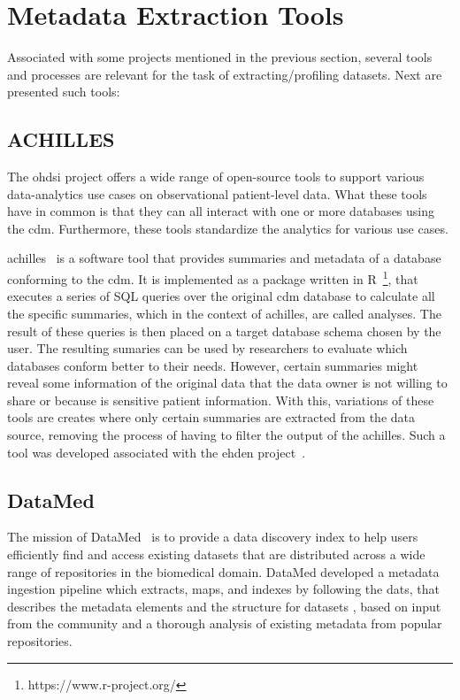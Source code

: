 \section{Metadata Extraction Tools}

Associated with some projects mentioned in the previous section, several tools and
processes are relevant for the task of extracting/profiling datasets.
Next are presented such tools:

\subsection*{ACHILLES}
The \gls{ohdsi} project offers a wide range of open-source tools\cite{ohdsi-tools} to support various data-analytics use cases on observational patient-level data.
What these tools have in common is that they can all interact with one or more databases using the \gls{cdm}.
Furthermore, these tools standardize the analytics for various use cases.

\gls{achilles}~\cite{achilles-github} is a software tool that provides summaries and metadata of a database conforming to the \gls{cdm}.
It is implemented as a package written in R~\footnote{https://www.r-project.org/}, that executes a series of SQL queries over the original \gls{cdm} database to calculate all the specific summaries, which in the context of \gls{achilles}, are called analyses.
The result of these queries is then placed on a target database schema chosen by the user.
The resulting sumaries can be used by researchers to evaluate which databases conform better to their needs.
However, certain summaries might reveal some information of the original data that the data owner is not willing to share or because is sensitive patient information.
With this, variations of these tools are creates where only certain summaries are extracted from the data source, removing the process of having to filter the output of the \gls{achilles}.
Such a tool was developed associated with the \gls{ehden} project~\cite{peters-tool}.

\subsection*{DataMed}
The mission of DataMed~\cite{datamed} is to provide a data discovery index to help users efficiently find and access existing datasets that are distributed across a wide range of repositories in the biomedical domain.
DataMed developed a metadata ingestion pipeline which extracts, maps, and indexes by following the \gls{dats}, that describes the metadata elements and the structure for datasets \cite{dats}, based on input from the community and a thorough analysis of existing metadata from popular repositories.

